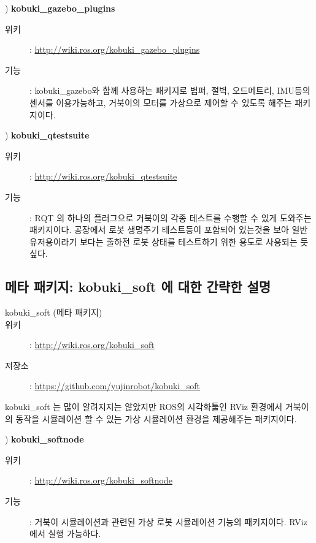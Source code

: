 \vspace{\baselineskip}
\noindent{}
\thenum) \textbf{kobuki\_gazebo\_plugins}
\begin{description}
\item[위키]: \url{http://wiki.ros.org/kobuki_gazebo_plugins}
\item[기능]: kobuki\_gazebo와 함께 사용하는 패키지로 범퍼, 절벽, 오드메트리, IMU등의 센서를 이용가능하고, 거북이의 모터를 가상으로 제어할 수 있도록 해주는 패키지이다.
\end{description}

\vspace{\baselineskip}
\noindent{}
\thenum) \textbf{kobuki\_qtestsuite}
\begin{description}
\item[위키]: \url{http://wiki.ros.org/kobuki_qtestsuite}
\item[기능]: RQT 의 하나의 플러그으로 거북이의 각종 테스트를 수행할 수 있게 도와주는 패키지이다. 공장에서 로봇 생명주기 테스트등이 포함되어 있는것을 보아 일반 유저용이라기 보다는 출하전 로봇 상태를 테스트하기 위한 용도로 사용되는 듯 싶다.
\end{description}

\subsection{메타 패키지: kobuki\_soft 에 대한 간략한 설명}

\vspace{\baselineskip}
\begin{description}
\item[kobuki\_soft (메타 패키지)]
\item[위키]: \url{http://wiki.ros.org/kobuki_soft}
\item[저장소]: \url{https://github.com/yujinrobot/kobuki_soft}
\end{description}

\vspace{\baselineskip}
\noindent
kobuki\_soft 는 많이 알려지지는 않았지만 ROS의 시각화툴인 RViz 환경에서 거북이의 동작을 시뮬레이션 할 수 있는 가상 시뮬레이션 환경을 제공해주는 패키지이다.

\setcounter{num}{0}

\vspace{\baselineskip}
\noindent{}
\thenum) \textbf{kobuki\_softnode}
\begin{description}
\item[위키]: \url{http://wiki.ros.org/kobuki_softnode}
\item[기능]: 거북이 시뮬레이션과 관련된 가상 로봇 시뮬레이션 기능의 패키지이다. RViz 에서 실행 가능하다.
\end{description}

